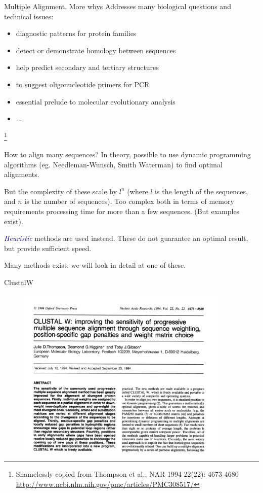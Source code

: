 \documentclass[pdf]{beamer}
\newcommand\blfootnote[1]{%
  \begingroup  %
  \renewcommand\thefootnote{}\footnote{#1}%
  \addtocounter{footnote}{-1}  %
  \endgroup
}
\begin{document}
\begin{frame}{Multiple Alignment. More whys}
  Addresses many biological questions and technical issues:
  \begin{itemize}
  \item diagnostic patterns for protein families
  \item detect or demonstrate homology between sequences
  \item help predict secondary and tertiary structures
  \item to suggest oligonucleotide primers for PCR
  \item essential prelude to molecular evolutionary analysis
  \item ...
  \end{itemize}
  \blfootnote{Shamelessly copied from Thompson et al., NAR 1994 22(22): 4673-4680\\
    \url{http://www.ncbi.nlm.nih.gov/pmc/articles/PMC308517/}
  }
\end{frame}

\begin{frame}{How to align many sequences?}
  In theory, possible to use dynamic programming algorithms (eg. Needleman-Wunsch,
  Smith Waterman) to find optimal alignments.

  But the complexity of these scale by $l^n$ (where $l$ is the length of the sequences,
  and $n$ is the number of sequences). Too complex both in terms of memory requirements
  processing time for more than a few sequences. (But examples exist).

  \textcolor{navy}{\emph{Heuristic}} methods are used instead. These do not guarantee an
  optimal result, but provide sufficient speed.

  Many methods exist: we will look in detail at one of these.
\end{frame}

\begin{frame}{ClustalW}
  \begin{figure}[ht]
    \includegraphics[width=0.9\textwidth]{images/clustalw_title}
  \end{figure}
\end{frame}
\end{document}
